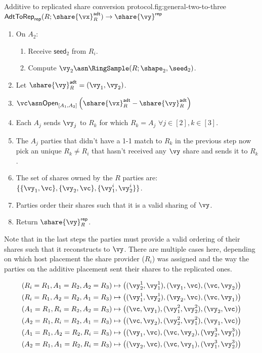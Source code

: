\begin{Boxfig}{Additive to replicated share conversion
protocol.}{fig:general-two-to-three}{$\mathsf{AdtToRep}_\mathsf{rep}(R;
\share{\vx}^{\mathsf{adt}}_{R}) \rightarrow \share{\vy}^\mathsf{rep}$}
\begin{enumerate}
\item On $A_2$:
\begin{enumerate}
    \item Receive $\mathsf{seed}_2$ from $R_i$.
    \item Compute $\vy_2 \asn \RingSample(R; \shape_2, \seed_2)$.
\end{enumerate}
\item Let $\share{\vy}^{\mathsf{adt}}_{R} = (\vy_1, \vy_2)$.
\item $\vc \asn \mathsf{Open}_{[A_1, A_2]}\left( \share{\vx}^{\mathsf{adt}}_{R}
- \share{\vy}^{\mathsf{adt}}_{R} \right)$
\item Each $A_j$ sends $\vy_j$ to $R_k$ for which $R_k = A_j$ $\forall j \in [2], k \in [3]$.
\item The $A_j$ parties that didn't have a 1-1 match to $R_k$ in the previous step now pick an unique $R_k \neq R_i$
that hasn't received any $\vy$ share and sends it to $R_k$.
\item The set of shares owned by the $R$ parties are: $\{ \{\vy_1, \vc\}, \{\vy_2, \vc\}, \{\vy^i_1, \vy^i_2\} \}$.
\item Parties order their shares such that it is a valid sharing of $\vy$.
\item Return $\share{\vy}^{\mathsf{rep}}_{R}$.
\end{enumerate}
\end{Boxfig}

Note that in the last steps the parties must provide a valid ordering of their
shares such that it reconstructs to $\vy$. There are multiple cases here,
depending on which host placement the share provider ($R_i$) was assigned and
the way the parties on the additive placement sent their shares to the replicated ones.

\begin{align*}
(R_i = R_1, A_1 = R_2, A_2 = R_3) \mapsto \left( (\vy_2^1, \vy_1^1), (\vy_1, \vc), (\vc, \vy_2) \right) \\
(R_i = R_1, A_2 = R_2, A_1 = R_3) \mapsto \left( (\vy_1^1, \vy_2^1), (\vy_2, \vc), (\vc, \vy_1) \right) \\
(A_1 = R_1, R_i = R_2, A_2 = R_3) \mapsto \left( (\vc, \vy_1), (\vy^2_1, \vy^2_2), (\vy_2, \vc) \right) \\
(A_2 = R_1, R_i = R_2, A_1 = R_3) \mapsto \left( (\vc, \vy_2), (\vy^2_2, \vy^2_1), (\vy_1, \vc) \right) \\
(A_1 = R_1, A_2 = R_2, R_i = R_3) \mapsto \left( (\vy_1, \vc), (\vc, \vy_2), (\vy_2^3, \vy_1^3) \right) \\
(A_2 = R_1, A_1 = R_2, R_i = R_3) \mapsto \left( (\vy_2, \vc), (\vc, \vy_1), (\vy_1^3, \vy_2^3) \right)
\end{align*}